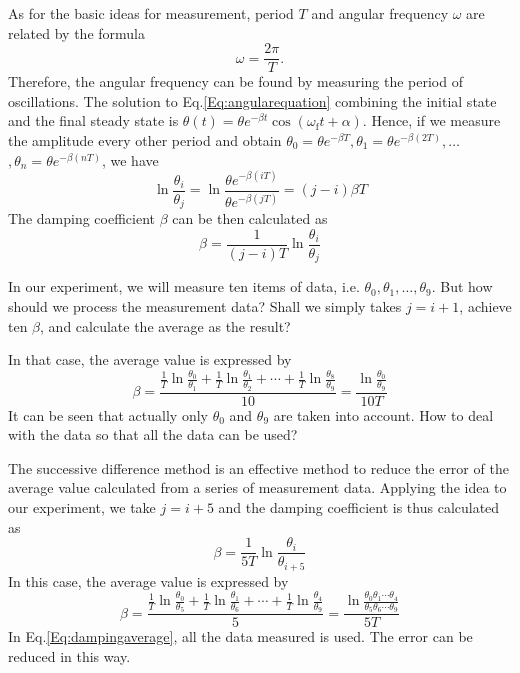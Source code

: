 \documentclass[a4paper]{article}
\begin{document}
As for the basic ideas for measurement, period $T$ and angular frequency $\omega$ are related by the formula
\begin{equation}\label{Eq:omega}
\omega = \frac{2 \pi}{T}.
\end{equation}
Therefore, the angular frequency can be found by measuring the period of oscillations.
The solution to Eq.\ref{Eq:angularequation} combining the initial state and the final steady state is $\theta(t)=\theta e^{-\beta t} \cos \left(\omega_{\mathrm{f}} t+\alpha\right)$. Hence, if we measure the amplitude every other period and obtain $\theta_{0}=\theta e^{-\beta T}, \theta_{1}=\theta e^{-\beta(2 T)},\ldots$ $, \theta_{n}=\theta e^{-\beta(n T)}$, we have
\begin{equation}\label{Eq:predampingrelation}
\ln \frac{\theta_{i}}{\theta_{j}}=\ln \frac{\theta e^{-\beta(i T)}}{\theta e^{-\beta(j T)}}=(j-i) \beta T
\end{equation}
The damping coefficient $\beta$ can be then calculated as
\begin{equation}\label{Eq:predampingcoefficient}
\beta=\frac{1}{(j-i) T} \ln \frac{\theta_{i}}{\theta_{j}}
\end{equation}

In our experiment, we will measure ten items of data, i.e. $\theta_{0},\theta_{1},\ldots,\theta_{9}$. But how should we process the measurement data? Shall we simply takes $j=i+1$, achieve ten $\beta$, and calculate the average as the result?

In that case, the average value is expressed by
\begin{equation}
\beta = \frac{\frac{1}{T} \ln \frac{\theta_{0}}{\theta_{1}} + \frac{1}{T} \ln \frac{\theta_{1}}{\theta_{2}} + \cdots + \frac{1}{T} \ln \frac{\theta_{8}}{\theta_{9}}}{10} = \frac{\ln \frac{\theta_{0}}{\theta_{9}}}{10T}
\end{equation}
It can be seen that actually only $\theta_{0}$ and $\theta_{9}$ are taken into account. How to deal with the data so that all the data can be used?

The successive difference method is an effective method to reduce the error of the average value calculated from a series of measurement data. Applying the idea to our experiment, we take $j=i+5$ and the damping coefficient is thus calculated as
\begin{equation}\label{Eq:damping}
\beta=\frac{1}{5 T} \ln \frac{\theta_{i}}{\theta_{i+5}}
\end{equation}
In this case, the average value is expressed by
\begin{equation}\label{Eq:dampingaverage}
\beta = \frac{\frac{1}{T} \ln \frac{\theta_{0}}{\theta_{5}} + \frac{1}{T} \ln \frac{\theta_{1}}{\theta_{6}} + \cdots + \frac{1}{T} \ln \frac{\theta_{4}}{\theta_{9}}}{5} = \frac{\ln \frac{\theta_{0}\theta_{1}\cdots\theta_{4}}{\theta_{5}\theta_{6}\cdots\theta_{9}}}{5T}
\end{equation}
In Eq.\ref{Eq:dampingaverage}, all the data measured is used. The error can be reduced in this way.
\end{document}

